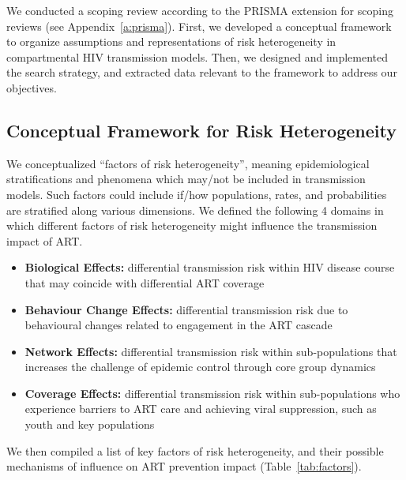 We conducted a scoping review according to the PRISMA extension for scoping reviews
(see Appendix~\ref{a:prisma}).
First, we developed a conceptual framework to organize
assumptions and representations of risk heterogeneity
in compartmental HIV transmission models.
Then, we designed and implemented the search strategy,
and extracted data relevant to the framework to address our objectives.
\subsection{Conceptual Framework for Risk Heterogeneity}
\label{ss:meth:framework}
We conceptualized ``factors of risk heterogeneity'', meaning
epidemiological stratifications and phenomena which may/not be included in transmission models.
Such factors could include if/how populations, rates, and probabilities
are stratified along various dimensions.
We defined the following 4 domains in which
different factors of risk heterogeneity might influence the transmission impact of ART.
\begin{itemize}
  \item \textbf{Biological Effects:}
  differential transmission risk within HIV disease course
  that may coincide with differential ART coverage
  \cite{Pilcher2004}
  \item \textbf{Behaviour Change Effects:}
  differential transmission risk due to
  behavioural changes related to engagement in the ART cascade
  \cite{Ramachandran2016,Tiwari2020}
  \item \textbf{Network Effects:}
  differential transmission risk within sub-populations
  that increases the challenge of epidemic control through core group dynamics
  \cite{Boily1997,Watts2010,Dodd2010}
  \item \textbf{Coverage Effects:}
  differential transmission risk within sub-populations
  who experience barriers to ART care and achieving viral suppression,
  such as youth and key populations
  \cite{Mountain2014,Lancaster2016,Hakim2018,Green2020}
\end{itemize}
We then compiled a list of key factors of risk heterogeneity,
and their possible mechanisms of influence on ART prevention impact (Table~\ref{tab:factors}).
\begin{sidewaystable}
  \caption{%
    Factors of heterogeneity in HIV transmission
    and their possible mechanisms of influence on the prevention impact of ART interventions}
  
  \label{tab:factors}
\end{sidewaystable}
